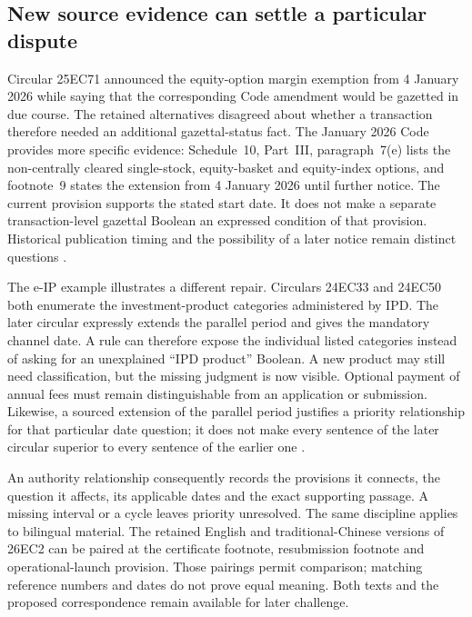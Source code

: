 \subsection{New source evidence can settle a particular dispute}

Circular 25EC71 announced the equity-option margin exemption from 4 January
2026 while saying that the corresponding Code amendment would be gazetted in
due course. The retained alternatives disagreed about whether a transaction
therefore needed an additional gazettal-status fact. The January 2026 Code
provides more specific evidence: Schedule~10, Part~III, paragraph~7(e) lists the
non-centrally cleared single-stock, equity-basket and equity-index options, and
footnote~9 states the extension from 4 January 2026 until further notice.
The current provision supports the stated start date. It does not make a
separate transaction-level gazettal Boolean an expressed condition of that
provision. Historical publication timing and the possibility of a later notice
remain distinct questions \citep{sfcmargin2025,sfccode2026}.

The e-IP example illustrates a different repair. Circulars 24EC33 and 24EC50
both enumerate the investment-product categories administered by IPD. The later
circular expressly extends the parallel period and gives the mandatory channel
date. A rule can therefore expose the individual listed categories instead of
asking for an unexplained ``IPD product'' Boolean. A new product may still need
classification, but the missing judgment is now visible. Optional payment of
annual fees must remain distinguishable from an application or submission.
Likewise, a sourced extension of the parallel period justifies a priority
relationship for that particular date question; it does not make every sentence
of the later circular superior to every sentence of the earlier one
\citep{sfceiplaunch2024,sfceipadoption2024}.

An authority relationship consequently records the provisions it connects, the
question it affects, its applicable dates and the exact supporting passage.
A missing interval or a cycle leaves priority unresolved. The same discipline
applies to bilingual material. The retained English and traditional-Chinese
versions of 26EC2 can be paired at the certificate footnote, resubmission
footnote and operational-launch provision. Those pairings permit comparison;
matching reference numbers and dates do not prove equal meaning. Both texts and
the proposed correspondence remain available for later challenge.

